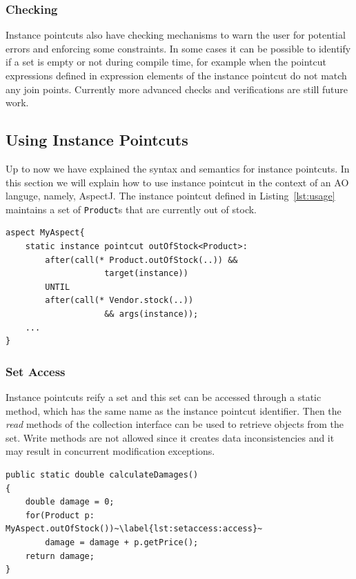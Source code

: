 \documentclass{acm_proc_article-sp}
\begin{document}
\subsubsection{Checking}
Instance pointcuts also have checking mechanisms to warn the user for potential errors and enforcing some constraints. In some cases it can be possible to identify if a set is empty or not during compile time, for example when the pointcut expressions defined in expression elements of the instance pointcut do not match any join points. 
Currently more advanced checks and verifications are still future work.

\subsection{Using Instance Pointcuts}
Up to now we have explained the syntax and semantics for instance pointcuts. In this section we will explain how to use instance pointcut in the context of an AO languge, namely, AspectJ. The instance pointcut defined in Listing~\ref{lst:usage} maintains a set of \lstinline{Product}s that are currently out of stock.

\begin{lstlisting}[float=h!, caption={An instance pointcut for out of stock products}, label={lst:usage}]
aspect MyAspect{
	static instance pointcut outOfStock<Product>: 
		after(call(* Product.outOfStock(..)) && 
					target(instance)) 
		UNTIL 
		after(call(* Vendor.stock(..)) 
					&& args(instance));
	...
}
\end{lstlisting}

\subsubsection{Set Access}
Instance pointcuts reify a set and this set can be accessed through a static method, which has the same name as the instance pointcut identifier. Then the \emph{read} methods of the collection interface can be used to retrieve objects from the set. Write methods are not allowed since it creates data inconsistencies and it may result in concurrent modification exceptions. 


\begin{lstlisting}[float=h!, caption={Calculate a damage estimate for out of stock products}, label={lst:setaccess}]
public static double calculateDamages()
{
	double damage = 0;
	for(Product p: MyAspect.outOfStock())~\label{lst:setaccess:access}~
		damage = damage + p.getPrice();
	return damage;
}
\end{lstlisting}
\end{document}
